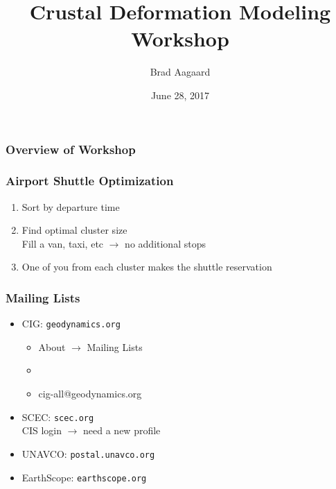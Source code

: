 \documentclass[aspectratio=169]{beamer}
\title{Crustal Deformation Modeling Workshop}
\subtitle{}
\author{Brad Aagaard}
\institute{\texttt{[image: ../../logos/cig\_blackfg]}}
\date{June 28, 2017}
\begin{document}
\maketitle



\begin{frame}
  \frametitle{Overview of Workshop}
  
  

\end{frame}



\begin{frame}
  \frametitle{Airport Shuttle Optimization}
  \summary{}

  \begin{enumerate}
  \item Sort by departure time
  \item Find optimal cluster size\\
    Fill a van, taxi, etc $\rightarrow$ no additional stops
  \item One of you from each cluster makes the shuttle reservation
  \end{enumerate}
  \vfill

\end{frame}

\begin{frame}
  \frametitle{Mailing Lists}

  \begin{itemize}
  \item CIG: {\tt geodynamics.org}
    \begin{itemize}
    \item About $\rightarrow$ Mailing Lists
    \item {}
    \item cig-all@geodynamics.org
    \end{itemize}
  \item SCEC: {\tt scec.org}\\
    CIS login $\rightarrow$ need a new profile
  \item UNAVCO: {\tt postal.unavco.org}
  \item EarthScope: {\tt earthscope.org}
  \end{itemize}

\end{frame}


\end{document}

